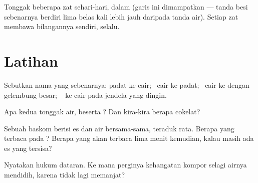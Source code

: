 \begin{omfigure}

{\small Tonggak beberapa zat sehari-hari, dalam  (garis
ini dimampatkan --- tanda besi sebenarnya berdiri lima belas kali
lebih jauh daripada tanda air). Setiap zat membawa bilangannya
sendiri, selalu.}
\end{omfigure}

\section{Latihan}

\begin{exercise}[$\star$]\label{exo:g4:changes-of-state:1}
Sebutkan nama yang sebenarnya: padat ke cair; \ cair ke padat; \ cair
ke  dengan gelembung besar; \  ke cair pada jendela yang dingin.
\end{exercise}

\begin{exercise}[$\star$]\label{exo:g4:changes-of-state:2}
Apa kedua tonggak air, beserta ? Dan kira-kira berapa  cokelat?
\end{exercise}

\begin{exercise}[$\star$]\label{exo:g4:changes-of-state:3}
Sebuah baskom berisi es dan air bersama-sama, teraduk rata. Berapa
yang terbaca pada ? Berapa yang akan terbaca lima menit
kemudian, kalau masih ada es yang tersisa?
\end{exercise}

\begin{exercise}[$\star$]\label{exo:g4:changes-of-state:4}
Nyatakan hukum dataran. Ke mana perginya kehangatan kompor selagi
airnya mendidih, karena  tidak lagi memanjat?
\end{exercise}

